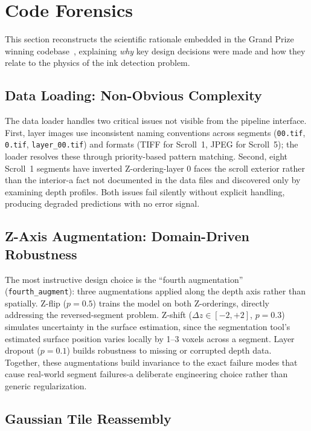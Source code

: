 \section{Code Forensics}
\label{sec:code_forensics}

This section reconstructs the scientific rationale embedded in the Grand Prize winning codebase~\cite{nader2024gp, landau2024gpplus}, explaining \emph{why} key design decisions were made and how they relate to the physics of the ink detection problem.

\subsection{Data Loading: Non-Obvious Complexity}

The data loader handles two critical issues not visible from the pipeline interface. First, layer images use inconsistent naming conventions across segments (\texttt{00.tif}, \texttt{0.tif}, \texttt{layer\_00.tif}) and formats (TIFF for Scroll~1, JPEG for Scroll~5); the loader resolves these through priority-based pattern matching. Second, eight Scroll~1 segments have inverted Z-ordering-layer 0 faces the scroll exterior rather than the interior-a fact not documented in the data files and discovered only by examining depth profiles. Both issues fail silently without explicit handling, producing degraded predictions with no error signal.

\subsection{Z-Axis Augmentation: Domain-Driven Robustness}

The most instructive design choice is the ``fourth augmentation'' (\texttt{fourth\_augment}): three augmentations applied along the depth axis rather than spatially. Z-flip ($p = 0.5$) trains the model on both Z-orderings, directly addressing the reversed-segment problem. Z-shift ($\Delta z \in [-2, +2]$, $p = 0.3$) simulates uncertainty in the surface estimation, since the segmentation tool's estimated surface position varies locally by 1--3 voxels across a segment. Layer dropout ($p = 0.1$) builds robustness to missing or corrupted depth data. Together, these augmentations build invariance to the exact failure modes that cause real-world segment failures-a deliberate engineering choice rather than generic regularization.

\subsection{Gaussian Tile Reassembly}

